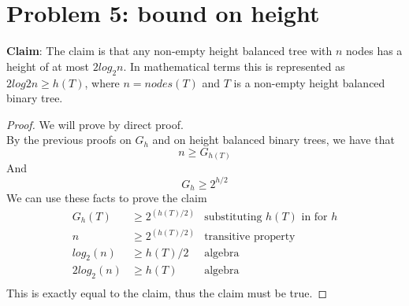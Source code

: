 \documentclass[titlepage]{article}
\begin{document}
\section{Problem 5: bound on height}

\textbf{Claim}: The claim is that any non-empty height balanced tree with $n$ nodes has a height of at most $2log_2n$. In mathematical terms this is represented as $2log2n \geq h(T)$, where $n = nodes(T)$ and $T$ is a non-empty height balanced binary tree.

\begin{proof}
We will prove by direct proof.\\

By the previous proofs on $G_h$ and on height balanced binary trees, we have that
$$n \geq G_{h(T)}$$
And
$$G_h \geq 2^{h/2}$$
We can use these facts to prove the claim
\begin{align*}
G_h(T) &\geq 2^{(h(T)/2)}  & \text{substituting $h(T)$ in for $h$} \\
n &\geq 2^{(h(T)/2)} & \text{transitive property} \\
log_2(n) &\geq h(T)/2 & \text{algebra} \\
2log_2(n) &\geq h(T) & \text{algebra} \\
\end{align*}
This is exactly equal to the claim, thus the claim must be true.

\end{proof}
\end{document}
